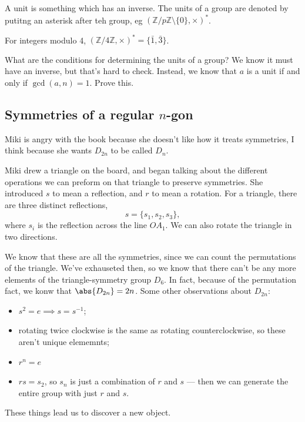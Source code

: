 \begin{definition}[Units]
A unit is something which has an inverse. The units of a group are denoted by putitng an asterisk after teh group, eg $(\mathbb{Z}/p\mathbb{Z} \setminus \{0\}, \times)^*$.
\end{definition}

\begin{example}
For integers modulo 4, $(\mathbb{Z}/4\mathbb{Z}, \times)^* = \{\bar{1}, \bar{3}\}$.
\end{example}

\begin{problem}[On Homework]
What are the conditions for determining the units of a group? We know it must have an inverse, but that's hard to check. Instead, we know that $a$ is a unit if and only if $\gcd(a,n) = 1$. Prove this.
\end{problem}

\subsection{Symmetries of a regular \texorpdfstring{$n$}{n}-gon}
Miki is angry with the book because she doesn't like how it treats symmetries, I think because she wants $D_{2n}$ to be called $D_n$.

Miki drew a triangle on the board, and began talking about the different operations we can preform on that triangle to preserve symmetries. She introduced $s$ to mean a reflection, and $r$ to mean a rotation. For a triangle, there are three distinct reflections,
\[ s = \{s_1, s_2, s_3 \}, \]
where $s_i$ is the reflection across the line $OA_1$. We can also rotate the triangle in two directions.

We know that these are all the symmetries, since we can count the permutations of the triangle. We've exhauseted then, so we know that there can't be any more elements of the triangle-symmetry group $D_6$. In fact, because of the permutation fact, we konw that $\abs{D_{2n}} = 2n$. Some other observations about $D_{2n}$:
\begin{itemize}
\item $s^2 = e \implies s = s^{-1}$;
\item rotating twice clockwise is the same as rotating counterclockwise, so these aren't unique elememnts;
\item $r^n = e$
\item $rs = s_2$, so $s_n$ is just a combination of $r$ and $s$ --- then we can generate the entire group with just $r$ and $s$.
\end{itemize}
These things lead us to discover a new object.

